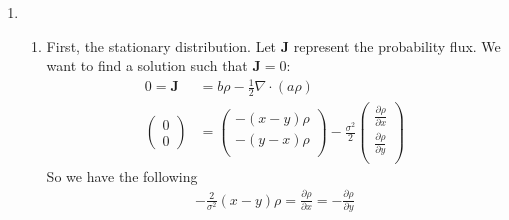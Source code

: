 \documentclass[12pt]{article}
\theoremstyle{plain}
\theoremstyle{definition}
\theoremstyle{remark}
\begin{document}
\begin{enumerate}
  \item %
    \begin{enumerate}
      \item %
        First, the stationary distribution. Let $\mathbf{J}$ represent
        the probability flux. We want to find a solution such that
        $\mathbf{J}=0$:
        \begin{align*}
          0 = \mathbf{J} &= b\rho - \frac{1}{2}\nabla\cdot(a\rho)\\
          \begin{pmatrix}
            0 \\ 0
          \end{pmatrix}
          &=
          \begin{pmatrix}
            -(x-y) \rho \\
            -(y-x) \rho \\
          \end{pmatrix}
          - \frac{\sigma^2}{2}
          \begin{pmatrix}
            \frac{\partial \rho}{\partial x} \\
            \frac{\partial \rho}{\partial y} \\
          \end{pmatrix}
        \end{align*}
        So we have the following
        \begin{align*}
          -\frac{2}{\sigma^2} (x-y) \rho
          = \frac{\partial \rho}{\partial x}
          = -\frac{\partial \rho}{\partial y}
        \end{align*}
    \end{enumerate}


\end{enumerate}
\end{document}
